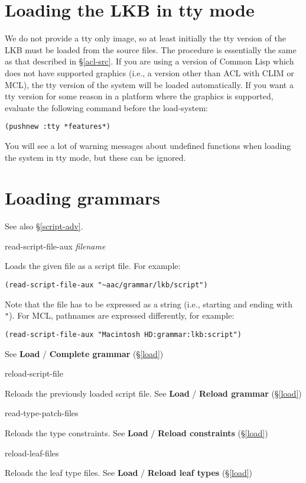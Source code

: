 \documentclass[12pt]{report}
\newcommand{\lispcommand}[1]{\noindent\rm #1}%
\begin{document}
\section{Loading the LKB in tty mode}

We do not provide a tty only image, so at least initially the tty
version of the LKB must be loaded from the source files.
The procedure is essentially the same as that described in \S\ref{acl-src}.
If you are using a version of Common Lisp which does not have supported
graphics (i.e., a version other than ACL with CLIM or MCL), the
tty version of the system will be loaded automatically.  If you
want a tty version for some reason in a platform where the graphics 
is supported, evaluate the following command before the load-system:
\begin{verbatim}
(pushnew :tty *features*)
\end{verbatim}
You will see a lot of warning messages about undefined functions 
when loading the system in tty mode, but these can be ignored.


\section{Loading grammars}

See also \S\ref{script-adv}.

\lispcommand{read-script-file-aux {\it filename}}

Loads the given file as a script file.
For example: 
\begin{verbatim}
(read-script-file-aux "~aac/grammar/lkb/script")
\end{verbatim}
Note that the file has to be expressed as a string
(i.e., starting and ending with {\tt "}).
For MCL, pathnames are expressed differently, for example:
\begin{verbatim}
(read-script-file-aux "Macintosh HD:grammar:lkb:script")
\end{verbatim}
See {\bf Load} / {\bf Complete grammar} (\S\ref{load})

\lispcommand{reload-script-file}

Reloads the previously loaded script file.
See {\bf Load} / {\bf Reload grammar} (\S\ref{load})

\lispcommand{read-type-patch-files}

Reloads the type constraints.
See {\bf Load} / {\bf Reload constraints} (\S\ref{load})

\lispcommand{reload-leaf-files}

Reloads the leaf type files.
See {\bf Load} / {\bf Reload leaf types} (\S\ref{load})
\end{document}
